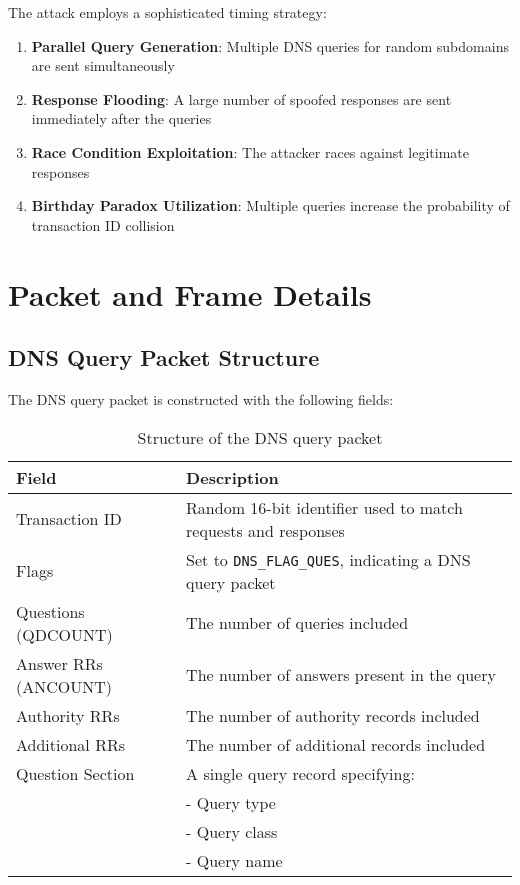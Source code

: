 \documentclass[12pt,a4paper]{article}
\begin{document}
The attack employs a sophisticated timing strategy:

\begin{enumerate}
    \item \textbf{Parallel Query Generation}: Multiple DNS queries for random subdomains are sent simultaneously
    \item \textbf{Response Flooding}: A large number of spoofed responses are sent immediately after the queries
    \item \textbf{Race Condition Exploitation}: The attacker races against legitimate responses
    \item \textbf{Birthday Paradox Utilization}: Multiple queries increase the probability of transaction ID collision
\end{enumerate}

\section{Packet and Frame Details}

\subsection{DNS Query Packet Structure}

The DNS query packet is constructed with the following fields\cite{cert-dns}:

\begin{table}[H]
\centering
\begin{tabular}{|l|p{8cm}|}
\hline
\textbf{Field} & \textbf{Description} \\
\hline
Transaction ID & Random 16-bit identifier  used to match requests and responses \\
\hline
Flags & Set to \texttt{DNS\_FLAG\_QUES}, indicating a DNS query packet \\
\hline
Questions (QDCOUNT) &  The number of queries included \\
\hline
Answer RRs (ANCOUNT) &  The number of answers present in the query \\
\hline
Authority RRs & The number of authority records included \\
\hline
Additional RRs & The number of  additional records included \\
\hline
Question Section & A single query record specifying: \\
& \quad - Query type  \\
& \quad - Query class  \\
& \quad - Query name  \\
\hline
\end{tabular}
\caption{Structure of the DNS query packet}
\end{table}
\end{document}
